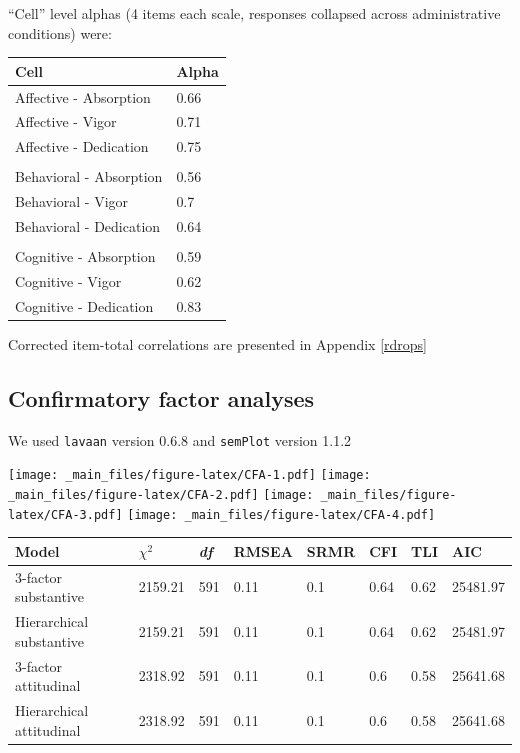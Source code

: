 \documentclass[
]{book}
\begin{document}
``Cell'' level alphas (4 items each scale, responses collapsed across administrative conditions) were:

\begin{longtable}[]{@{}ll@{}}
\toprule
Cell & Alpha \\
\midrule
\endhead
Affective - Absorption & 0.66 \\
Affective - Vigor & 0.71 \\
Affective - Dedication & 0.75 \\
& \\
Behavioral - Absorption & 0.56 \\
Behavioral - Vigor & 0.7 \\
Behavioral - Dedication & 0.64 \\
& \\
Cognitive - Absorption & 0.59 \\
Cognitive - Vigor & 0.62 \\
Cognitive - Dedication & 0.83 \\
\bottomrule
\end{longtable}

Corrected item-total correlations are presented in Appendix \ref{rdrops}

\hypertarget{confirmatory-factor-analyses}{%
\subsection{Confirmatory factor analyses}\label{confirmatory-factor-analyses}}

We used \texttt{lavaan} version 0.6.8 \citep{R-lavaan} and \texttt{semPlot} version 1.1.2 \citep{R-semPlot}

\texttt{[image: \_main\_files/figure-latex/CFA-1.pdf]} \texttt{[image: \_main\_files/figure-latex/CFA-2.pdf]} \texttt{[image: \_main\_files/figure-latex/CFA-3.pdf]} \texttt{[image: \_main\_files/figure-latex/CFA-4.pdf]}

\begin{longtable}[]{@{}llllllll@{}}
\toprule
Model & \(\chi^2\) & \emph{df} & RMSEA & SRMR & CFI & TLI & AIC \\
\midrule
\endhead
3-factor substantive & 2159.21 & 591 & 0.11 & 0.1 & 0.64 & 0.62 & 25481.97 \\
Hierarchical substantive & 2159.21 & 591 & 0.11 & 0.1 & 0.64 & 0.62 & 25481.97 \\
3-factor attitudinal & 2318.92 & 591 & 0.11 & 0.1 & 0.6 & 0.58 & 25641.68 \\
Hierarchical attitudinal & 2318.92 & 591 & 0.11 & 0.1 & 0.6 & 0.58 & 25641.68 \\
\bottomrule
\end{longtable}
\end{document}
